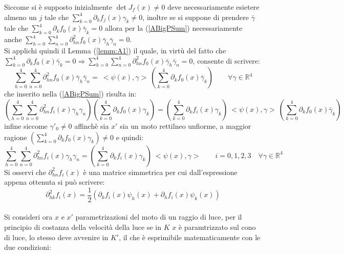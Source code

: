 Siccome si è supposto inizialmente $\det J_f(x)\neq 0$ deve necessariamente esietere almeno un $j$ tale che $\sum_{k=0}^{4}\partial_kf_j(x)\gamma_k\neq 0$, 
inoltre se si suppone di prendere $\bar{\gamma}$ tale che $\sum_{k=0}^4\partial_kf_0(x)\bar{\gamma}_k=0$ allora per la (\ref{ABigPSum}) necessariamente 
anche $\sum_{h=0}^4\sum_{n=0}^4\partial^2_{hn}f_0(x)\bar{\gamma}_h\bar{\gamma}_n=0$.\\

Si applichi quindi il Lemma (\ref{lemm:A1}) il quale, in virtù del fatto che $\sum_{k=0}^4\partial_kf_0(x)\bar{\gamma}_k=0\Rightarrow 
\sum_{h=0}^4\sum_{n=0}^4\partial^2_{hn}f_0(x)\bar{\gamma}_h\bar{\gamma}_n=0$, consente di scrivere:
\begin{equation*}
    \sum_{h=0}^4\sum_{n=0}^4\partial^2_{hn}f_0(x)\bar{\gamma}_h\bar{\gamma}_n=\ <\psi(x),\gamma>\ (\sum_{k=0}^4\partial_kf_0(x)\bar{\gamma}_k) \qquad \forall \gamma \in \mathbb{R}^4   
\end{equation*}
che inserito nella (\ref{ABigPSum}) risulta in:
\begin{equation*}
    \left(\sum_{h=0}^4\sum_{n=0}^4\partial^2_{hn}f_i(x)\gamma_h\gamma_n\right)\left(\sum_{k=0}^4\partial_kf_0(x)\gamma_k\right)
    = \left(\sum_{k=0}^4\partial_kf_i(x)\gamma_k\right)\ <\psi(x),\gamma>\ (\sum_{k=0}^4\partial_kf_0(x)\bar{\gamma}_k)
\end{equation*}
infine siccome $\gamma'_0\neq 0$ affinchè sia $x'$ sia un moto rettilneo unfiorme, a maggior ragione $\left(\sum_{k=0}^4\partial_kf_0(x)\gamma_k\right) \neq 0$ 
e quindi:
\begin{equation}
    \sum_{h=0}^4\sum_{n=0}^4\partial^2_{hn}f_i(x)\gamma_h\gamma_n=\left(\sum_{k=0}^4\partial_kf_i(x)\gamma_k\right)\ <\psi(x),\gamma> \qquad i=0,1,2,3 \quad \forall \gamma \in \mathbb{R}^4
    \label{APArtialScal}
\end{equation}
Si osservi che  $\partial^2_{hn}f_i(x)$ è una matrice simmetrica per cui dall'espressione appena ottenuta si può scrivere:
\begin{equation}
    \partial^2_{hk}f_i(x)=\frac{1}{2}\left(\partial_kf_i(x)\psi_h(x)+\partial_hf_i(x)\psi_k(x)\right)
    \label{APArtialScalSimm}
\end{equation}
\\
Si consideri ora $x$ e $x'$ parametrizazioni del moto di un raggio di luce, per il principio di costanza della velocità della luce 
se in $K$ $x$ è paramtrizzato sul cono di luce, lo stesso deve avvenire in $K'$, il che è esprimibile matematicamente con le due condizioni:
